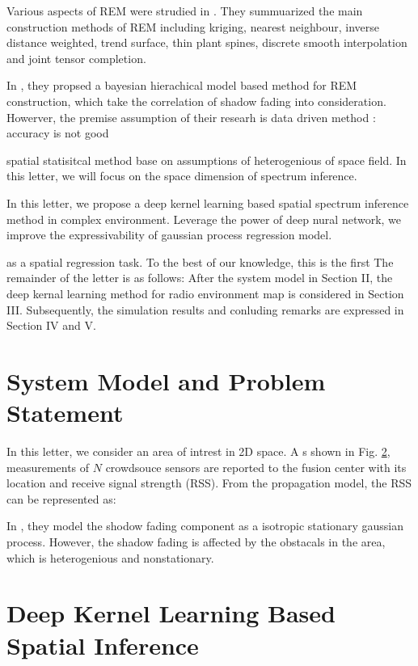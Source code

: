 \documentclass[journal, oneside, twocolumn]{IEEEtran}
\begin{document}
Various aspects of REM were strudied in \cite{Li2018}. They summuarized the main construction methods of REM including kriging, nearest neighbour, inverse distance weighted, trend surface, thin plant spines, discrete smooth interpolation and joint tensor completion. 

In \cite{Xu2021}, they propsed a bayesian hierachical model based method for REM construction, which take the correlation of shadow fading into consideration. Howerver, the premise assumption of their researh is 
data driven method : accuracy is not good

spatial statisitcal method base on assumptions of heterogenious of space field. 
In this letter, we will focus on the space dimension of spectrum inference.


In this letter, we propose a deep kernel learning based spatial spectrum inference method in complex environment. Leverage the power of deep nural network, we improve the expressivability of gaussian process regression model.

as a spatial regression task.
To the best of our knowledge, this is the first 
The remainder of the letter is as follows: After the system model in Section II, the deep kernal learning method for radio environment map is considered in Section III. Subsequently, the simulation results and conluding remarks are expressed in Section IV and V.



\section{System Model and Problem Statement}

In this letter, we consider an area of intrest in 2D space. A s shown in Fig. \ref{}, measurements of $N$ crowdsouce sensors are reported to the fusion center with its location and receive signal strength (RSS). 
From the propagation model, the RSS can be represented as:

In , they model the shodow fading component as a isotropic stationary gaussian process. However, the shadow fading is affected by the obstacals in the area, which is heterogenious and nonstationary.
\section{Deep Kernel Learning Based Spatial Inference}
\end{document}
